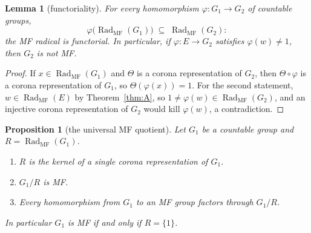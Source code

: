 \documentclass[11pt]{amsart}
\newcommand{\leanverified}[2]{\ignorespaces}
\newtheorem{proposition}[theorem]{Proposition}
\newtheorem{lemma}[theorem]{Lemma}
\theoremstyle{definition}
\theoremstyle{remark}
\theoremstyle{plain}
\begin{document}
\begin{lemma}[functoriality]\label{lem:portable}
For every homomorphism $\varphi\colon G_1\to G_2$ of countable
groups,
\[
  \varphi\bigl(\operatorname{Rad}_{\mathrm{MF}}(G_1)\bigr)
  \;\subseteq\;\operatorname{Rad}_{\mathrm{MF}}(G_2):
\]
the MF radical is functorial.  In particular, if
$\varphi\colon E\to G_2$ satisfies $\varphi(w)\neq1$, then $G_2$ is
not MF.
\leanverified{Sofic/ManuscriptExactWrappers}{GroupApproximation.ManuscriptExactWrappers.manuscriptRadicalPortability}
\end{lemma}

\begin{proof}
If $x\in\operatorname{Rad}_{\mathrm{MF}}(G_1)$ and $\Theta$ is a
corona representation of $G_2$, then $\Theta\circ\varphi$ is a corona
representation of $G_1$, so $\Theta(\varphi(x))=1$.  For the second
statement, $w\in\operatorname{Rad}_{\mathrm{MF}}(E)$ by
Theorem~\ref{thm:A}, so
$1\neq\varphi(w)\in\operatorname{Rad}_{\mathrm{MF}}(G_2)$, and an
injective corona representation of $G_2$ would kill $\varphi(w)$, a
contradiction.
\end{proof}

\begin{proposition}[the universal MF quotient]\label{prop:univquot}
Let $G_1$ be a countable group and
$R=\operatorname{Rad}_{\mathrm{MF}}(G_1)$.
\begin{enumerate}
\item $R$ is the kernel of a single corona representation of $G_1$.
\item $G_1/R$ is MF.
\item Every homomorphism from $G_1$ to an MF group factors through
$G_1/R$.
\end{enumerate}
In particular $G_1$ is MF if and only if $R=\{1\}$.
\leanverified{Sofic/ManuscriptExactWrappers}{GroupApproximation.ManuscriptExactWrappers.manuscriptUniversalMFQuotient}
\end{proposition}
\end{document}
